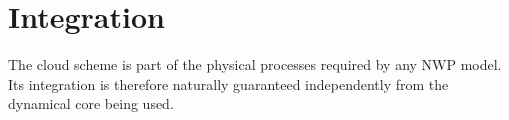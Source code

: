 \documentclass[
a4paper,     %
12pt,        %
article,
onecolumn,   %
openany,     %
]{memoir}
\begin{document}
 


\section{Integration}
The cloud scheme is part of the physical processes required 
by any NWP model. Its integration is therefore naturally 
guaranteed independently from the dynamical core being 
used.


\backmatter




\end{document}

